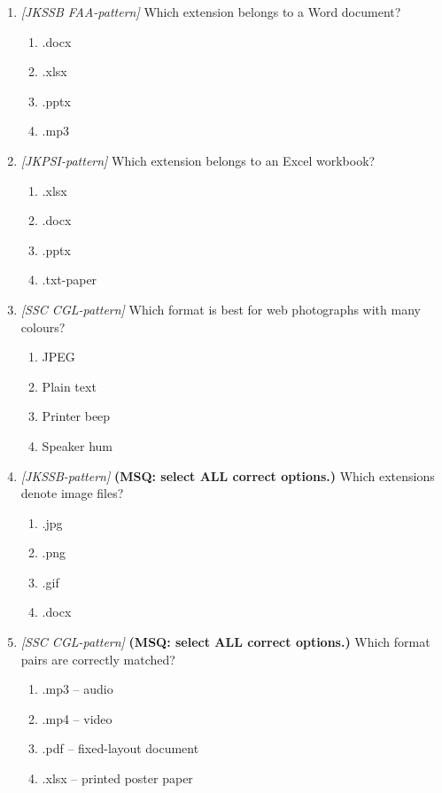 \documentclass[11pt]{article}
\begin{document}
\begin{enumerate}[label=\textbf{Q\arabic*.}, leftmargin=*]
\item \textit{[JKSSB FAA-pattern]} Which extension belongs to a Word document?
  \begin{enumerate}[label=\Alph*.]
    \item .docx
    \item .xlsx
    \item .pptx
    \item .mp3
  \end{enumerate}
\item \textit{[JKPSI-pattern]} Which extension belongs to an Excel workbook?
  \begin{enumerate}[label=\Alph*.]
    \item .xlsx
    \item .docx
    \item .pptx
    \item .txt-paper
  \end{enumerate}
\item \textit{[SSC CGL-pattern]} Which format is best for web photographs with many colours?
  \begin{enumerate}[label=\Alph*.]
    \item JPEG
    \item Plain text
    \item Printer beep
    \item Speaker hum
  \end{enumerate}
\item \textit{[JKSSB-pattern]} \textbf{(MSQ: select ALL correct options.)} Which extensions denote image files?
  \begin{enumerate}[label=\Alph*.]
    \item .jpg
    \item .png
    \item .gif
    \item .docx
  \end{enumerate}
\item \textit{[SSC CGL-pattern]} \textbf{(MSQ: select ALL correct options.)} Which format pairs are correctly matched?
  \begin{enumerate}[label=\Alph*.]
    \item .mp3 -- audio
    \item .mp4 -- video
    \item .pdf -- fixed-layout document
    \item .xlsx -- printed poster paper
  \end{enumerate}
\end{enumerate}
\def\JKSSBLessonID{55}\def\JKSSBAnswers{0}
\end{document}
